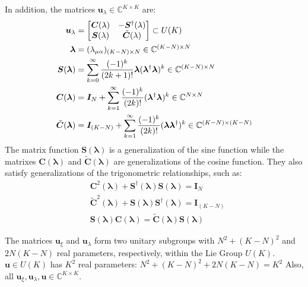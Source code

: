 \documentclass{aux/ttuthes2007}
\newcommand{\paren}[1]{\left( #1 \right)}
\newcommand{\elec}{N}
\newcommand{\orb}{K}
\newcommand{\uo}[1]{
		\IfEqCase{#1}{
			{0}{\mu}
			{1}{\nu}
			{2}{\xi}
		}[\PackageError{uo}{Undefined option to uo: #1}{}]
}
\newcommand{\oo}[1]{
		\IfEqCase{#1}{
			{0}{\alpha}
			{1}{\beta}
			{2}{\gamma}
		}[\PackageError{unocorb}{Undefined option to unuo: #1}{}]
}
\begin{document}
%
In addition, the matrices $\bm u_\lambda \in \mathbb{C}^{\orb \times \orb}$ are:
%
\begin{equation}
\begin{split}
	\label{eq:ulambda}
	\bm u_\lambda &= \begin{bmatrix}\bm C(\lambda) & -\bm S^\dagger(\lambda) \\ \bm S(\lambda) & \tilde {\bm C}(\lambda)\end{bmatrix} \subset U(\orb) \\
	\bm \lambda &= (\lambda_{\uo 0 \oo 0})_{(\orb - \elec)\times \elec} \in \mathbb{C}^{\paren{\orb - \elec} \times \elec} \\
	\bm S(\bm \lambda) &= \sum_{k=0}^\infty \frac{(-1)^k}{(2k + 1)!}\bm \lambda(\bm \lambda^\dagger\bm \lambda)^k \in \mathbb{C}^{\paren{\orb - \elec} \times \elec}\\
	\bm C(\bm \lambda) &= \bm I_\elec + \sum_{k=1}^\infty \frac{(-1)^k}{(2k)!}(\bm \lambda^\dagger\bm \lambda)^k \in \mathbb{C}^{\elec \times \elec}\\
	\tilde {\bm C}(\bm \lambda) &= \bm I_{(\orb - \elec)} + \sum_{k=1}^\infty \frac{(-1)^k}{(2k)!}(\bm \lambda\bm \lambda^\dagger)^k \in \mathbb{C}^{\paren{\orb - \elec} \times \paren{\orb - \elec}}
\end{split}
\end{equation}
%
The matrix function $\bm S(\bm \lambda)$ is a generalization of the sine function while the matrixes $\bm C(\bm \lambda)$ and $\tilde {\bm C}(\bm \lambda)$ are generalizations of the cosine function. They also satisfy generalizations of the trigonometric relationships, such as:
%
\begin{equation*}
\begin{split}
	&\bm C^2(\bm \lambda) + \bm S^\dagger(\bm \lambda)\bm S(\bm \lambda) = \bm I_{\elec} \\
	&\tilde{\bm C}^2(\bm \lambda) + \bm S(\bm \lambda)\bm S^\dagger(\bm \lambda) = \bm I_{\paren{\orb - \elec}} \\
	&\bm S(\bm \lambda)\bm C(\bm \lambda) = \tilde{\bm C}(\bm \lambda)\bm S(\bm \lambda)
\end{split}
\end{equation*}

The matrices $\bm u_\xi$ and $\bm u_\lambda$ form two unitary subgroups with 
$\elec^2 + \paren{\orb - \elec}^2$ 
and 
$2\elec\paren{\orb - \elec}$
real parameters, respectively, within the Lie Group 
$U(\orb)$. $\bm u \in U(\orb)$ has $\orb^2$ real parameters:
$\elec^2 + \paren{\orb - \elec}^2 + 2\elec\paren{\orb - \elec} = \orb^2$
Also, all 
$\bm u_\xi, \bm u_\lambda, \bm u \in \mathbb{C}^{\orb\times\orb}$.
\end{document}
